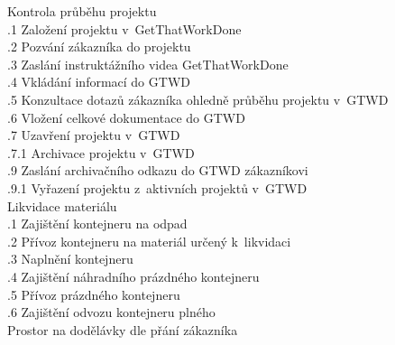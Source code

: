 \documentclass[a4paper, twoside, 11pt]{article}
\begin{document}
	 Kontrola průběhu projektu\\
		\indent {}.1 Založení projektu v~GetThatWorkDone\\
		\indent {}.2 Pozvání zákazníka do projektu\\
		\indent {}.3 Zaslání instruktážního videa GetThatWorkDone\\
		\indent {}.4 Vkládání informací do GTWD\\
		\indent {}.5 Konzultace dotazů zákazníka ohledně průběhu projektu v~GTWD\\
		\indent {}.6 Vložení celkové dokumentace do GTWD\\
		\indent {}.7 Uzavření projektu v~GTWD\\
		\indent \indent {}.7.1 Archivace projektu v~GTWD\\
		\indent {}.9 Zaslání archivačního odkazu do GTWD zákazníkovi\\
		\indent \indent {}.9.1 Vyřazení projektu z~aktivních projektů v~GTWD\\

	 Likvidace materiálu\\
			\indent {}.1 Zajištění kontejneru na odpad\\
			\indent {}.2 Přívoz kontejneru na materiál určený k~likvidaci\\
			\indent {}.3 Naplnění kontejneru\\
			\indent {}.4 Zajištění náhradního prázdného kontejneru\\
			\indent {}.5 Přívoz prázdného kontejneru\\
			\indent {}.6 Zajištění odvozu kontejneru plného\\

	 Prostor na dodělávky dle přání zákazníka\\
\end{document}

